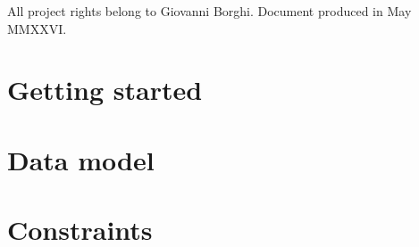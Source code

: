 \bigskip
\noindent
All project rights belong to Giovanni Borghi.
Document produced in May MMXXVI.

\vspace{0.6em}
\begin{center}
{\Large\color{cIndaco}\aldineleft\enskip\aldineright}
\end{center}
\vfill

\cleardoublepage

\tableofcontents
\listoffigures
\listoftables

\mainmatter


\part{Getting started}
\label{part:per_iniziare_en}








\part{Data model}
\label{part:modello_dati_en}




\part{Constraints}
\label{part:vincoli_en}


